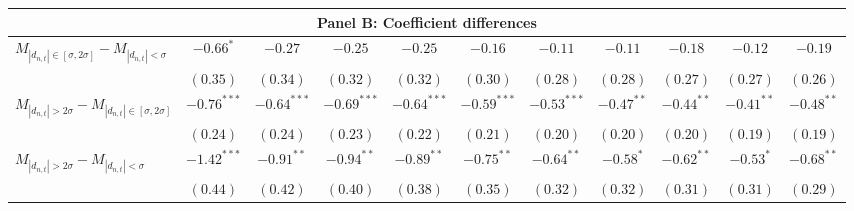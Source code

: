 \begin{tabular}{lcccccccccc}
   \hline \multicolumn{11}{c}{Panel B: Coefficient differences} \\
 \hline$M_{|d_{n,t}| \in [\sigma, 2\sigma]} - M_{|d_{n,t}| < \sigma}$ & $-0.66^{*}$ & $-0.27$ & $-0.25$ & $-0.25$ & $-0.16$ & $-0.11$ & $-0.11$ & $-0.18$ & $-0.12$ & $-0.19$ \\ 
   & $(0.35)$ & $(0.34)$ & $(0.32)$ & $(0.32)$ & $(0.30)$ & $(0.28)$ & $(0.28)$ & $(0.27)$ & $(0.27)$ & $(0.26)$ \\ 
  $M_{|d_{n,t}| > 2 \sigma} - M_{|d_{n,t}| \in [\sigma, 2\sigma]}$ & $-0.76^{***}$ & $-0.64^{***}$ & $-0.69^{***}$ & $-0.64^{***}$ & $-0.59^{***}$ & $-0.53^{***}$ & $-0.47^{**}$ & $-0.44^{**}$ & $-0.41^{**}$ & $-0.48^{**}$ \\ 
   & $(0.24)$ & $(0.24)$ & $(0.23)$ & $(0.22)$ & $(0.21)$ & $(0.20)$ & $(0.20)$ & $(0.20)$ & $(0.19)$ & $(0.19)$ \\ 
  $M_{|d_{n,t}| > 2 \sigma} - M_{|d_{n,t}| < \sigma}$ & $-1.42^{***}$ & $-0.91^{**}$ & $-0.94^{**}$ & $-0.89^{**}$ & $-0.75^{**}$ & $-0.64^{**}$ & $-0.58^{*}$ & $-0.62^{**}$ & $-0.53^{*}$ & $-0.68^{**}$ \\ 
   & $(0.44)$ & $(0.42)$ & $(0.40)$ & $(0.38)$ & $(0.35)$ & $(0.32)$ & $(0.32)$ & $(0.31)$ & $(0.31)$ & $(0.29)$ \\ 
   \hline 
\end{tabular}
